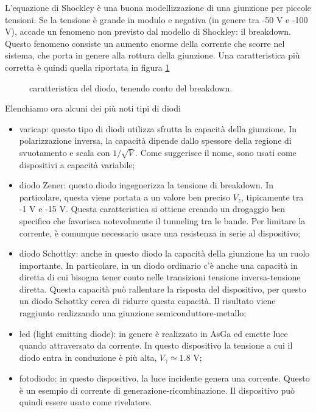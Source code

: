 \documentclass[a4paper, 11pt]{article}
\begin{document}
	L'equazione di Shockley è una buona modellizzazione di una giunzione per piccole tensioni. Se la tensione è grande in modulo e negativa (in genere tra -50 V e -100 V), accade un fenomeno non previsto dal modello di Shockley: il breakdown. Questo fenomeno consiste un aumento enorme della corrente che scorre nel sistema, che porta in genere alla rottura della giunzione. Una caratteristica più corretta è quindi quella riportata in figura \ref{fig:breakdown}
	\begin{figure}[h!]
		\centering
		\caption{caratteristica del diodo, tenendo conto del breakdown.}
		\label{fig:breakdown}
	\end{figure}
	Elenchiamo ora alcuni dei più noti tipi di diodi
	\begin{itemize}
		\item varicap: questo tipo di diodi utilizza sfrutta la capacità della giunzione. In polarizzazione inversa, la capacità dipende dallo spessore della regione di svuotamento e scala con $1/\sqrt{V}$. Come suggerisce il nome, sono usati come dispositivi a capacità variabile;
		\item diodo Zener: questo diodo ingegnerizza la tensione di breakdown. In particolare, questa viene portata a un valore ben preciso $V_z$, tipicamente tra -1 V e -15 V. Questa caratteristica si ottiene creando un drogaggio ben specifico che favorisca notevolmente il tunneling tra le bande. Per limitare la corrente, è comunque necessario usare una resistenza in serie al dispositivo;
		\item diodo Schottky: anche in questo diodo la capacità della giunzione ha un ruolo importante. In particolare, in un diodo ordinario c'è anche una capacità in diretta di cui bisogna tener conto nelle transizioni tensione inversa-tensione diretta. Questa capacità può rallentare la risposta del dispositivo, per questo un diodo Schottky cerca di ridurre questa capacità. Il risultato viene raggiunto realizzando una giunzione semiconduttore-metallo; 
		\item led (light emitting diode): in genere è realizzato in AsGa ed emette luce quando attraversato da corrente. In questo dispositivo la tensione a cui il diodo entra in conduzione è più alta, $V_\gamma\simeq1.8$ V;
		\item fotodiodo: in questo dispositivo, la luce incidente genera una corrente. Questo è un esempio di corrente di generazione-ricombinazione. Il dispositivo può quindi essere usato come rivelatore.
	\end{itemize}
\end{document}

